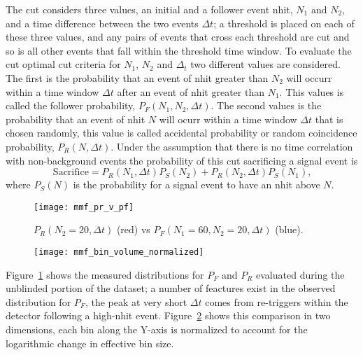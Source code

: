 The cut considers three values, an initial and a follower event nhit, $N_{1}$
and $N_{2}$, and a time difference between the two events $\Delta t$;
a threshold is placed on each of these three values, and any pairs of events that cross
each threshold are cut and so is all other events that fall within the threshold
time window.
To evaluate the cut optimal cut criteria for $N_{1}$, $N_{2}$ and $\Delta_{t}$
two different values are considered.
The first is the probability that an event of nhit greater than $N_{2}$ will occurr within a time
window $\Delta t$ after an event of nhit greater than $N_{1}$.
This values is called the follower probability, $P_{F}(N_{1}, N_{2}, \Delta t)$.
The second values is the probability that an event of nhit $N$ will ocurr
within a time window $\Delta t$ that is chosen randomly, this value
is called accidental probability or random coincidence probability, $P_{R}(N, \Delta t)$.
Under the assumption that there is no time correlation with non-background
events the probability of this cut sacrificing a signal event is
\begin{equation}
    \mathrm{Sacrifice} = P_{R}(N_{1},\Delta t)P_{S}(N_{2}) + P_{R}(N_{2}, \Delta t)P_{S}(N_{1})\text{,}
\end{equation}
where $P_{S}(N)$ is the probability for a signal event to have an nhit above
$N$.

\begin{figure}[htbp]
    \centering
    \texttt{[image: mmf\_pr\_v\_pf]}
    \caption[Missed Muon Follower Example PDFs]{
        $P_R(N_2=20, \Delta t)$ (red) vs $P_F(N_1=60, N_2=20, \Delta t)$ (blue).}
\label{fig:mmf_sac}
\end{figure}
\begin{figure}[htbp]
    \centering
    \texttt{[image: mmf\_bin\_volume\_normalized]}
    \caption[Two-Dimensional Comparison for Missed Muon Follower]{
}
\label{fig:mmf_sac2}
\end{figure}
Figure~\ref{fig:mmf_sac} shows the measured distributions for $P_{F}$ and $P_{R}$
evaluated during the unblinded portion of the dataset;
a number of feactures exist in the observed distribution for $P_{F}$,
the peak at very short $\Delta t$ comes from re-triggers within the
detector following a high-nhit event.
Figure~\ref{fig:mmf_sac2} shows this comparison in two dimensions, each
bin along the Y-axis is normalized to account for the logarithmic change
in effective bin size.

